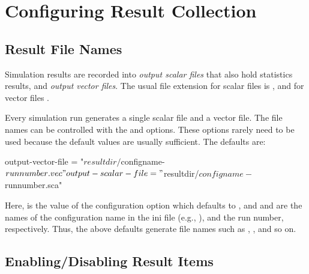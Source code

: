 \section{Configuring Result Collection}
\label{sec:ana-sim:config-results}

\subsection{Result File Names}
\label{sec:ana-sim:result-file-names}

Simulation results are recorded into \textit{output scalar files} that also hold
statistics results, and \textit{output vector files}. The usual file extension
for scalar files is , and for vector files .

Every simulation run generates a single scalar file and a vector file. The file
names can be controlled with the  and
 options. These options rarely need to be used
because the default values are usually sufficient. The defaults are:

\begin{inifile}
output-vector-file = "${resultdir}/${configname}-${runnumber}.vec"
output-scalar-file = "${resultdir}/${configname}-${runnumber}.sca"
\end{inifile}

Here,  is the value of the 
configuration option which defaults to , and
 and  are the names of the
configuration name in the ini file (e.g., ), and the run
number, respectively. Thus, the above defaults generate file names such as
, , and so on.



\subsection{Enabling/Disabling Result Items}
\label{sec:ana-sim:disabling-result-items}


